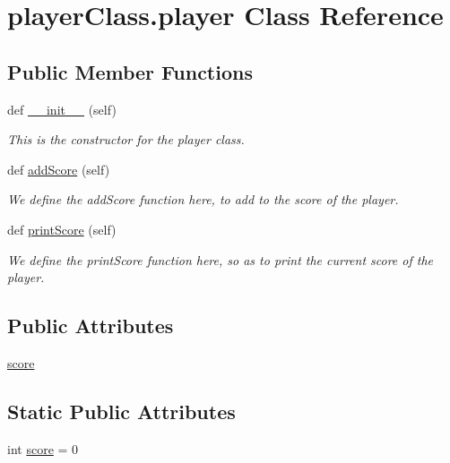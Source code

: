 \hypertarget{classplayerClass_1_1player}{}\section{player\+Class.\+player Class Reference}
\label{classplayerClass_1_1player}
\subsection*{Public Member Functions}
\begin{DoxyCompactItemize}
\item 
def \hyperlink{classplayerClass_1_1player_a81af066d0b8b37855c64396d79b5e2c7}{\+\_\+\+\_\+init\+\_\+\+\_\+} (self)
\begin{DoxyCompactList}\small\item\em This is the constructor for the player class. \end{DoxyCompactList}\item 
def \hyperlink{classplayerClass_1_1player_aacb26c3b66b98b5ad398eac2fd081e2d}{add\+Score} (self)
\begin{DoxyCompactList}\small\item\em We define the add\+Score function here, to add to the score of the player. \end{DoxyCompactList}\item 
def \hyperlink{classplayerClass_1_1player_a2d8ef3d133913f71282ee68df631d7e6}{print\+Score} (self)
\begin{DoxyCompactList}\small\item\em We define the print\+Score function here, so as to print the current score of the player. \end{DoxyCompactList}\end{DoxyCompactItemize}
\subsection*{Public Attributes}
\begin{DoxyCompactItemize}
\item 
\hyperlink{classplayerClass_1_1player_ac07178772e496cf05ef4fde8c42b7a34}{score}
\end{DoxyCompactItemize}
\subsection*{Static Public Attributes}
\begin{DoxyCompactItemize}
\item 
int \hyperlink{classplayerClass_1_1player_a27877a498f34b31f3d5e1baab97bea39}{score} = 0
\end{DoxyCompactItemize}


